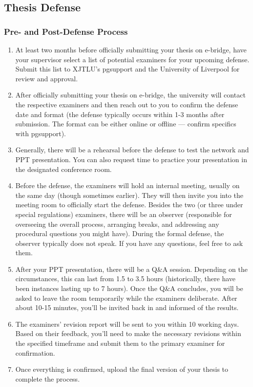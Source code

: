 \subsection{Thesis Defense}

\subsubsection{Pre- and Post-Defense Process}

\begin{enumerate}
    \item At least two months before officially submitting your thesis on e-bridge, have your supervisor select a list of potential examiners for your upcoming defense. Submit this list to XJTLU's pgsupport and the University of Liverpool for review and approval.
    \item After officially submitting your thesis on e-bridge, the university will contact the respective examiners and then reach out to you to confirm the defense date and format (the defense typically occurs within 1-3 months after submission. The format can be either online or offline — confirm specifics with pgsupport).
    \item Generally, there will be a rehearsal before the defense to test the network and PPT presentation. You can also request time to practice your presentation in the designated conference room.
    \item Before the defense, the examiners will hold an internal meeting, usually on the same day (though sometimes earlier). They will then invite you into the meeting room to officially start the defense. Besides the two (or three under special regulations) examiners, there will be an observer (responsible for overseeing the overall process, arranging breaks, and addressing any procedural questions you might have). During the formal defense, the observer typically does not speak. If you have any questions, feel free to ask them.
    \item After your PPT presentation, there will be a Q\&A session. Depending on the circumstances, this can last from 1.5 to 3.5 hours (historically, there have been instances lasting up to 7 hours). Once the Q\&A concludes, you will be asked to leave the room temporarily while the examiners deliberate. After about 10-15 minutes, you'll be invited back in and informed of the results.
    \item The examiners' revision report will be sent to you within 10 working days. Based on their feedback, you'll need to make the necessary revisions within the specified timeframe and submit them to the primary examiner for confirmation.
    \item Once everything is confirmed, upload the final version of your thesis to complete the process.
\end{enumerate}

